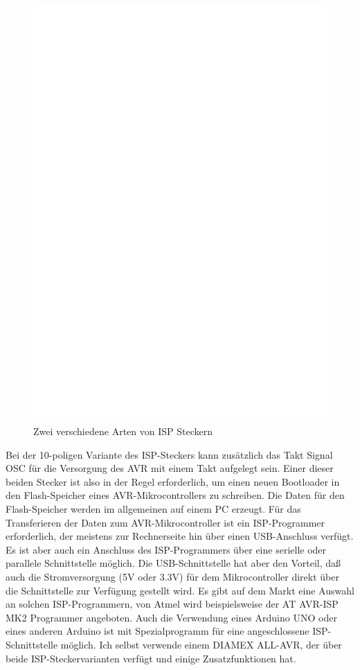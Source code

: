 \begin{figure}[H]
\centering
\includegraphics[width=12cm]{../FIG/ISP.eps}
\caption{Zwei verschiedene Arten von ISP Steckern}
\label{fig:ISP}
\end{figure}

Bei der 10-poligen Variante des ISP-Steckers kann zusätzlich das Takt Signal OSC für die Versorgung
des AVR mit einem Takt aufgelegt sein.
Einer dieser beiden Stecker ist also in der Regel erforderlich, um einen neuen Bootloader in den
Flash-Speicher eines AVR-Mikrocontrollers zu schreiben. Die Daten für den Flash-Speicher werden
im allgemeinen auf einem PC erzeugt.
Für das Transferieren der Daten zum AVR-Mikrocontroller ist ein ISP-Programmer
erforderlich, der meistens zur Rechnerseite hin über einen USB-Anschluss verfügt. Es ist aber auch
ein Anschluss des ISP-Programmers über eine serielle oder parallele Schnittstelle möglich.
Die USB-Schnittstelle hat aber den Vorteil, daß auch die Stromversorgung (5V oder 3.3V) für
dem Mikrocontroller direkt über die Schnittstelle zur Verfügung gestellt wird.
Es gibt auf dem Markt eine Auswahl an solchen ISP-Programmern, von Atmel wird beispielsweise der 
AT AVR-ISP MK2 Programmer angeboten.
Auch die Verwendung eines Arduino UNO oder eines anderen Arduino ist mit
Spezialprogramm für eine angeschlossene ISP-Schnittstelle  möglich.
Ich selbst verwende einem DIAMEX ALL-AVR, der über beide 
ISP-Steckervarianten verfügt und einige Zusatzfunktionen hat.


